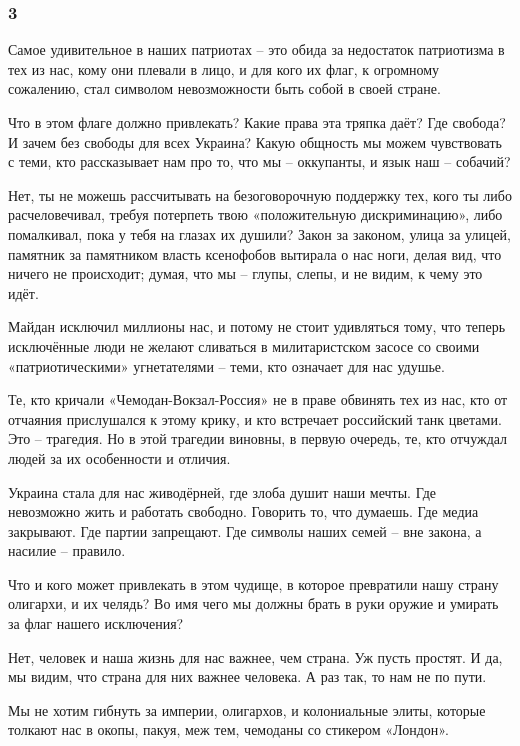  
 
 
 
 

\subsubsection{3}
\label{sec:19_02_2022.fb.uljanov_anatolij.1.mne_nravitsja_kak_ih_korezhit.3}

Самое удивительное в наших патриотах – это обида за недостаток патриотизма в
тех из нас, кому они плевали в лицо, и для кого их флаг, к огромному сожалению,
стал символом невозможности быть собой в своей стране.

Что в этом флаге должно привлекать? Какие права эта тряпка даёт? Где свобода? И
зачем без свободы для всех Украина? Какую общность мы можем чувствовать с теми,
кто рассказывает нам про то, что мы – оккупанты, и язык наш – собачий?

Нет, ты не можешь рассчитывать на безоговорочную поддержку тех, кого ты либо
расчеловечивал, требуя потерпеть твою «положительную дискриминацию», либо
помалкивал, пока у тебя на глазах их душили? Закон за законом, улица за улицей,
памятник за памятником власть ксенофобов вытирала о нас ноги, делая вид, что
ничего не происходит; думая, что мы – глупы, слепы, и не видим, к чему это
идёт.   

Майдан исключил миллионы нас, и потому не стоит удивляться тому, что теперь
исключённые люди не желают сливаться в милитаристском засосе со своими
«патриотическими» угнетателями – теми, кто означает для нас удушье.

Те, кто кричали «Чемодан-Вокзал-Россия» не в праве обвинять тех из нас, кто от
отчаяния прислушался к этому крику, и кто встречает российский танк цветами.
Это – трагедия. Но в этой трагедии виновны, в первую очередь, те, кто отчуждал
людей за их особенности и отличия.

Украина стала для нас живодёрней, где злоба душит наши мечты. Где невозможно
жить и работать свободно. Говорить то, что думаешь. Где медиа закрывают. Где
партии запрещают. Где символы наших семей – вне закона, а насилие – правило.

Что и кого может привлекать в этом чудище, в которое превратили нашу страну
олигархи, и их челядь? Во имя чего мы должны брать в руки оружие и умирать за
флаг нашего исключения? 

Нет, человек и наша жизнь для нас важнее, чем страна. Уж пусть простят. И да,
мы видим, что страна для них важнее человека. А раз так, то нам не по пути. 

Мы не хотим гибнуть за империи, олигархов, и колониальные элиты, которые
толкают нас в окопы, пакуя, меж тем, чемоданы со стикером «Лондон».

